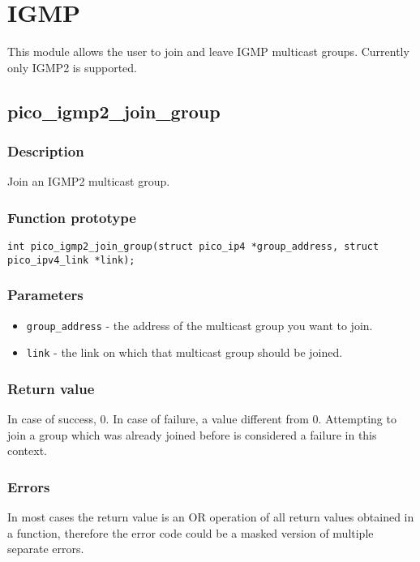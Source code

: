 \section{IGMP}

This module allows the user to join and leave IGMP multicast groups. Currently only IGMP2 is supported.


\subsection{pico\_igmp2\_join\_group}

\subsubsection*{Description}
Join an IGMP2 multicast group.

\subsubsection*{Function prototype}
\texttt{int pico\_igmp2\_join\_group(struct pico\_ip4 *group\_address, struct pico\_ipv4\_link *link);}

\subsubsection*{Parameters}
\begin{itemize}
\item \texttt{group\_address} - the address of the multicast group you want to join.
\item \texttt{link} - the link on which that multicast group should be joined.
\end{itemize}

\subsubsection*{Return value}
In case of success, 0. In case of failure, a value different from 0. Attempting to join a group which was already joined before is considered a failure in this context. 

\subsubsection*{Errors}
In most cases the return value is an OR operation of all return values obtained in a function, therefore the error code could be a masked version of multiple separate errors.

